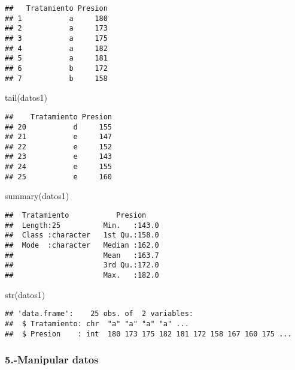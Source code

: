 \documentclass[
]{article}
\newenvironment{Shaded}{\begin{snugshade}}{\end{snugshade}}
\newcommand{\FunctionTok}[1]{\textcolor[rgb]{0.00,0.00,0.00}{#1}}
\newcommand{\NormalTok}[1]{#1}
\begin{document}
\begin{verbatim}
##   Tratamiento Presion
## 1           a     180
## 2           a     173
## 3           a     175
## 4           a     182
## 5           a     181
## 6           b     172
## 7           b     158
\end{verbatim}

\begin{Shaded}
\begin{Highlighting}[]
\FunctionTok{tail}\NormalTok{(datos1)}
\end{Highlighting}
\end{Shaded}

\begin{verbatim}
##    Tratamiento Presion
## 20           d     155
## 21           e     147
## 22           e     152
## 23           e     143
## 24           e     155
## 25           e     160
\end{verbatim}

\begin{Shaded}
\begin{Highlighting}[]
\FunctionTok{summary}\NormalTok{(datos1)}
\end{Highlighting}
\end{Shaded}

\begin{verbatim}
##  Tratamiento           Presion     
##  Length:25          Min.   :143.0  
##  Class :character   1st Qu.:158.0  
##  Mode  :character   Median :162.0  
##                     Mean   :163.7  
##                     3rd Qu.:172.0  
##                     Max.   :182.0
\end{verbatim}

\begin{Shaded}
\begin{Highlighting}[]
\FunctionTok{str}\NormalTok{(datos1)}
\end{Highlighting}
\end{Shaded}

\begin{verbatim}
## 'data.frame':    25 obs. of  2 variables:
##  $ Tratamiento: chr  "a" "a" "a" "a" ...
##  $ Presion    : int  180 173 175 182 181 172 158 167 160 175 ...
\end{verbatim}

\hypertarget{manipular-datos}{%
\subsubsection{\texorpdfstring{5.-Manipular datos
}{5.-Manipular datos  }}\label{manipular-datos}}
\end{document}
